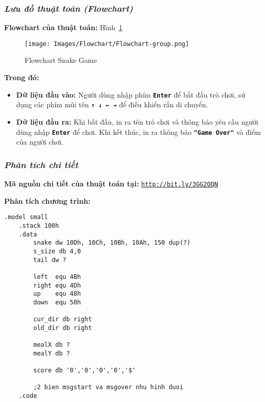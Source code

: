 \subsubsection{\textit{Lưu đồ thuật toán (Flowchart)}}

\vspace{0.5cm}
\noindent\textbf{\Large Flowchart của thuật toán:} Hình~\ref{fig:flowchart-group}

\vspace{0.3cm}
\begin{figure}[H]
    \centering
    \texttt{[image: Images/Flowchart/Flowchart-group.png]}
    \caption{Flowchart Snake Game}
    \label{fig:flowchart-group}
\end{figure}

\vspace{0.4cm}
\noindent \textbf{Trong đó:}
\begin{itemize}
    \itemsep0.2cm
    \item \textbf{Dữ liệu đầu vào:} Người dùng nhập phím \texttt{\textbf{Enter}} để bắt đầu trò chơi, sử dụng các phím mũi tên \texttt{\textbf{↑ ↓ ← →}} để điều khiển rắn di chuyển.
    \item \textbf{Dữ liệu đầu ra:} Khi bắt đầu, in ra tên trò chơi và thông báo yêu cầu người dùng nhập \texttt{\textbf{Enter}} để chơi. Khi kết thúc, in ra thông báo \texttt{\textbf{"Game Over"}} và điểm của người chơi.
\end{itemize}

\subsubsection{\textit{Phân tích chi tiết}}
\vspace{0.5cm}

\noindent \textbf{Mã nguồn chi tiết của thuật toán tại:} \href{http://bit.ly/3GG2OQN}{\texttt{\large http://bit.ly/3GG2OQN}}

\vspace{0.5cm}
\noindent\textbf{\Large Phân tích chương trình:}
\vspace{0.3cm}

\begin{lstlisting}[style=asm]
    .model small
    .stack 100h
    .data
        snake dw 10Dh, 10Ch, 10Bh, 10Ah, 150 dup(?) 
        s_size db 4,0     
        tail dw ?         
        
        left  equ 4Bh  
        right equ 4Dh   
        up    equ 48h
        down  equ 50h
    
        cur_dir db right  
        old_dir db right    
        
        mealX db ?
        mealY db ?
    
        score db '0','0','0','0','$' 
        
        ;2 bien msgstart va msgover nhu hinh duoi
    .code
\end{lstlisting}

